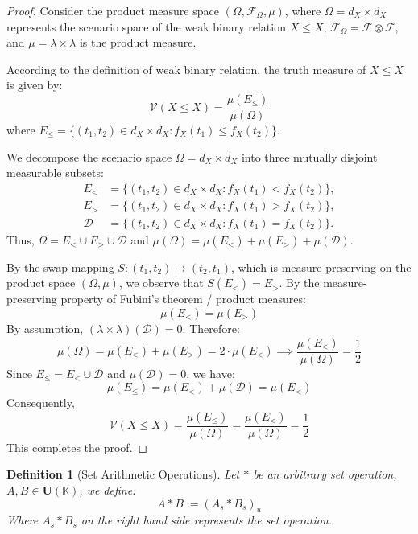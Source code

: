 \documentclass[a4paper,12pt, twoside]{memoir}
\newtheorem{definition}{Definition}[chapter]
\newcommand{\ddclmd}{\mathcal{V}} %
\begin{document}
\begin{proof}
	Consider the product measure space $(\Omega, \mathcal{F}_{\Omega}, \mu)$, where $\Omega = d_X \times d_X$ represents the scenario space of the weak binary relation $X \leq X$, $\mathcal{F}_{\Omega} = \mathcal{F} \otimes \mathcal{F}$, and $\mu = \lambda \times \lambda$ is the product measure.

	According to the definition of weak binary relation, the truth measure of $X \leq X$ is given by:
	\[
		\ddclmd(X \leq X) = \frac{\mu(E_{\leq})}{\mu(\Omega)}
	\]
	where $E_{\leq} = \{(t_1, t_2) \in d_X \times d_X : f_X(t_1) \leq f_X(t_2)\}$.

	We decompose the scenario space $\Omega = d_X \times d_X$ into three mutually disjoint measurable subsets:
	\begin{align*}
		E_{<}       & = \{(t_1, t_2) \in d_X \times d_X : f_X(t_1) < f_X(t_2)\}, \\
		E_{>}       & = \{(t_1, t_2) \in d_X \times d_X : f_X(t_1) > f_X(t_2)\}, \\
		\mathcal{D} & = \{(t_1, t_2) \in d_X \times d_X : f_X(t_1) = f_X(t_2)\}.
	\end{align*}
	Thus, $\Omega = E_{<} \cup E_{>} \cup \mathcal{D}$ and $\mu(\Omega) = \mu(E_{<}) + \mu(E_{>}) + \mu(\mathcal{D})$.

	By the swap mapping $S: (t_1, t_2) \mapsto (t_2, t_1)$, which is measure-preserving on the product space $(\Omega, \mu)$, we observe that $S(E_{<}) = E_{>}$. By the measure-preserving property of Fubini's theorem / product measures:
	\[
		\mu(E_{<}) = \mu(E_{>})
	\]
	By assumption, $(\lambda \times \lambda)(\mathcal{D}) = 0$. Therefore:
	\[
		\mu(\Omega) = \mu(E_{<}) + \mu(E_{>}) = 2 \cdot \mu(E_{<}) \implies \frac{\mu(E_{<})}{\mu(\Omega)} = \frac{1}{2}
	\]
	Since $E_{\leq} = E_{<} \cup \mathcal{D}$ and $\mu(\mathcal{D}) = 0$, we have:
	\[
		\mu(E_{\leq}) = \mu(E_{<}) + \mu(\mathcal{D}) = \mu(E_{<})
	\]
	Consequently,
	\[
		\ddclmd(X \leq X) = \frac{\mu(E_{\leq})}{\mu(\Omega)} = \frac{\mu(E_{<})}{\mu(\Omega)} = \frac{1}{2}
	\]
	This completes the proof.
\end{proof}

\begin{definition}[Set Arithmetic Operations]
	Let $*$ be an arbitrary set operation, $A, B \in \mathbf{U}(\mathbb{K})$, we define:
	\[
		A * B := (A_s * B_s)_u
	\]
	Where $A_s * B_s$ on the right hand side represents the set operation.
\end{definition}
\end{document}
